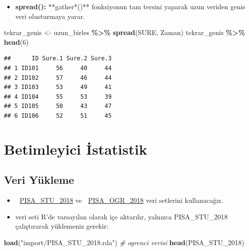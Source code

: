\documentclass[
  oneside]{book}
\newenvironment{Shaded}{\begin{snugshade}}{\end{snugshade}}
\newcommand{\CommentTok}[1]{\textcolor[rgb]{0.56,0.35,0.01}{\textit{#1}}}
\newcommand{\DecValTok}[1]{\textcolor[rgb]{0.00,0.00,0.81}{#1}}
\newcommand{\FunctionTok}[1]{\textcolor[rgb]{0.13,0.29,0.53}{\textbf{#1}}}
\newcommand{\NormalTok}[1]{#1}
\newcommand{\OtherTok}[1]{\textcolor[rgb]{0.56,0.35,0.01}{#1}}
\newcommand{\SpecialCharTok}[1]{\textcolor[rgb]{0.81,0.36,0.00}{\textbf{#1}}}
\newcommand{\StringTok}[1]{\textcolor[rgb]{0.31,0.60,0.02}{#1}}
\providecommand{\tightlist}{%
  \setlength{\itemsep}{0pt}\setlength{\parskip}{0pt}}
\begin{document}
\begin{itemize}
\tightlist
\item
  \textbf{spread():} **gather*()** fonksiyonun tam tersini yaparak uzun veriden genis veri olusturmaya yarar.
\end{itemize}

\begin{Shaded}
\begin{Highlighting}[]
\NormalTok{tekrar\_genis }\OtherTok{\textless{}{-}}\NormalTok{ uzun\_birles }\SpecialCharTok{\%\textgreater{}\%} \FunctionTok{spread}\NormalTok{(SURE, Zaman)}
\NormalTok{tekrar\_genis }\SpecialCharTok{\%\textgreater{}\%} \FunctionTok{head}\NormalTok{(}\DecValTok{6}\NormalTok{)}
\end{Highlighting}
\end{Shaded}

\begin{verbatim}
##      ID Sure.1 Sure.2 Sure.3
## 1 ID101     56     40     44
## 2 ID102     57     46     44
## 3 ID103     53     49     41
## 4 ID104     55     53     39
## 5 ID105     50     43     47
## 6 ID106     52     51     45
\end{verbatim}

\hypertarget{betimleyici-istatistik}{%
\chapter{Betimleyici İstatistik}\label{betimleyici-istatistik}}

\hypertarget{veri-yuxfckleme}{%
\section{Veri Yükleme}\label{veri-yuxfckleme}}

\begin{itemize}
\item
  🔗 \href{import/PISA_STU_2018.rda}{PISA\_STU\_2018} ve 🔗 \href{(import/PISA_OGR_2018.rda)}{PISA\_OGR\_2018} veri setlerini kullanacağız.
\item
  veri seti R'de varsayılan olarak içe aktarılır, yalnızca PISA\_STU\_2018 çalıştırarak yüklemeniz gerekir:
\end{itemize}

\begin{Shaded}
\begin{Highlighting}[]
\FunctionTok{load}\NormalTok{(}\StringTok{"import/PISA\_STU\_2018.rda"}\NormalTok{) }\CommentTok{\# ogrenci verisi}
\FunctionTok{head}\NormalTok{(PISA\_STU\_2018)}
\end{Highlighting}
\end{Shaded}
\end{document}
